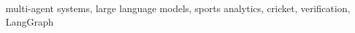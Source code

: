 \begin{IEEEkeywords}
multi-agent systems, large language models, sports analytics, cricket, verification, LangGraph
\end{IEEEkeywords}

